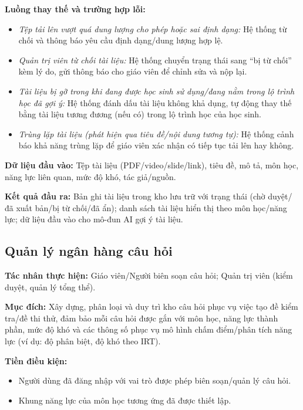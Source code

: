 \documentclass[12pt,a4paper]{article}
\newcommand{\ucfield}[2]{\noindent\textbf{#1: } #2\par\vspace{0.35em}}
\begin{document}
	\ucfield{Luồng thay thế và trường hợp lỗi}{
		\begin{itemize}[nosep]
			\item \textit{Tệp tải lên vượt quá dung lượng cho phép hoặc sai định dạng:} Hệ thống từ chối và thông báo yêu cầu định dạng/dung lượng hợp lệ.
			\item \textit{Quản trị viên từ chối tài liệu:} Hệ thống chuyển trạng thái sang ``bị từ chối'' kèm lý do, gửi thông báo cho giáo viên để chỉnh sửa và nộp lại.
			\item \textit{Tài liệu bị gỡ trong khi đang được học sinh sử dụng/đang nằm trong lộ trình học đã gợi ý:} Hệ thống đánh dấu tài liệu không khả dụng, tự động thay thế bằng tài liệu tương đương (nếu có) trong lộ trình học của học sinh.
			\item \textit{Trùng lặp tài liệu (phát hiện qua tiêu đề/nội dung tương tự):} Hệ thống cảnh báo khả năng trùng lặp để giáo viên xác nhận có tiếp tục tải lên hay không.
	\end{itemize}}
	
	\ucfield{Dữ liệu đầu vào}{Tệp tài liệu (PDF/video/slide/link), tiêu đề, mô tả, môn học, năng lực liên quan, mức độ khó, tác giả/nguồn.}
	
	\ucfield{Kết quả đầu ra}{Bản ghi tài liệu trong kho lưu trữ với trạng thái (chờ duyệt/đã xuất bản/bị từ chối/đã ẩn); danh sách tài liệu hiển thị theo môn học/năng lực; dữ liệu đầu vào cho mô-đun AI gợi ý tài liệu.}
	
	\subsection{Quản lý ngân hàng câu hỏi}
	
	\ucfield{Tác nhân thực hiện}{Giáo viên/Người biên soạn câu hỏi; Quản trị viên (kiểm duyệt, quản lý tổng thể).}
	
	\ucfield{Mục đích}{Xây dựng, phân loại và duy trì kho câu hỏi phục vụ việc tạo đề kiểm tra/đề thi thử, đảm bảo mỗi câu hỏi được gắn với môn học, năng lực thành phần, mức độ khó và các thông số phục vụ mô hình chấm điểm/phân tích năng lực (ví dụ: độ phân biệt, độ khó theo IRT).}
	
	\ucfield{Tiền điều kiện}{
		\begin{itemize}[nosep]
			\item Người dùng đã đăng nhập với vai trò được phép biên soạn/quản lý câu hỏi.
			\item Khung năng lực của môn học tương ứng đã được thiết lập.
	\end{itemize}}
	
\end{document}
